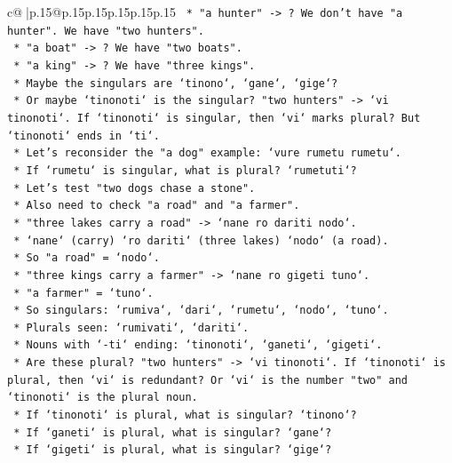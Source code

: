 \documentclass{article}
\begin{document}
{\begin{supertabular}{c@{$\;$}|p{.15\linewidth}@{}p{.15\linewidth}p{.15\linewidth}p{.15\linewidth}p{.15\linewidth}p{.15\linewidth}}
{{{\texttt{            *   "a hunter" {-}> ? We don't have "a hunter". We have "two hunters".} \\
\texttt{            *   "a boat" {-}> ? We have "two boats".} \\
\texttt{            *   "a king" {-}> ? We have "three kings".} \\
\texttt{            *   Maybe the singulars are `tinono`, `gane`, `gige`?} \\
\texttt{            *   Or maybe `tinonoti` is the singular? "two hunters" {-}> `vi tinonoti`. If `tinonoti` is singular, then `vi` marks plural? But `tinonoti` ends in `ti`.} \\
\texttt{            *   Let's reconsider the "a dog" example: `vure rumetu rumetu`.} \\
\texttt{            *   If `rumetu` is singular, what is plural? `rumetuti`?} \\
\texttt{            *   Let's test "two dogs chase a stone".} \\
\texttt{            *   Also need to check "a road" and "a farmer".} \\
\texttt{            *   "three lakes carry a road" {-}> `nane ro dariti nodo`.} \\
\texttt{                *   `nane` (carry) `ro dariti` (three lakes) `nodo` (a road).} \\
\texttt{                *   So "a road" = `nodo`.} \\
\texttt{            *   "three kings carry a farmer" {-}> `nane ro gigeti tuno`.} \\
\texttt{                *   "a farmer" = `tuno`.} \\
\texttt{            *   So singulars: `rumiva`, `dari`, `rumetu`, `nodo`, `tuno`.} \\
\texttt{            *   Plurals seen: `rumivati`, `dariti`.} \\
\texttt{            *   Nouns with `{-}ti` ending: `tinonoti`, `ganeti`, `gigeti`.} \\
\texttt{            *   Are these plural? "two hunters" {-}> `vi tinonoti`. If `tinonoti` is plural, then `vi` is redundant? Or `vi` is the number "two" and `tinonoti` is the plural noun.} \\
\texttt{            *   If `tinonoti` is plural, what is singular? `tinono`?} \\
\texttt{            *   If `ganeti` is plural, what is singular? `gane`?} \\
\texttt{            *   If `gigeti` is plural, what is singular? `gige`?} \\
}}}
\end{supertabular}}
\end{document}
